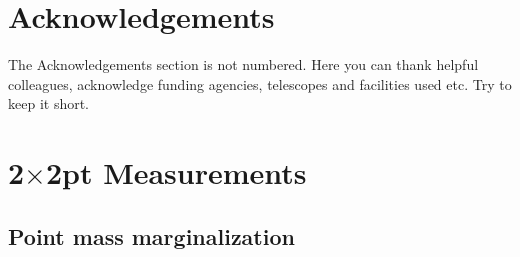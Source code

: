 \documentclass[fleqn,usenatbib]{mnras}
\begin{document}
\section*{Acknowledgements}

The Acknowledgements section is not numbered. Here you can thank helpful
colleagues, acknowledge funding agencies, telescopes and facilities used etc.
Try to keep it short.










\appendix

\section{2$\times$2pt Measurements}\label{app:2x2pt_measure}

\subsection{Point mass marginalization}
\end{document}
